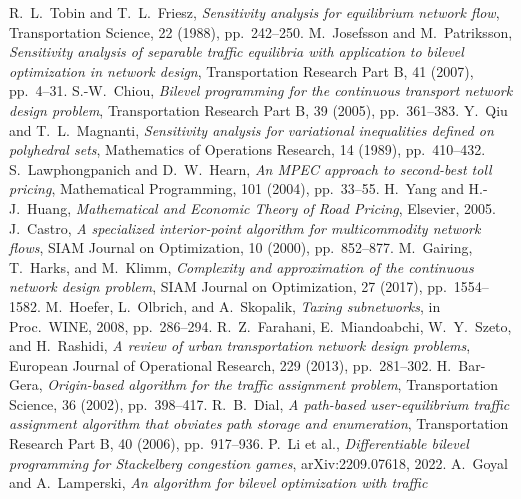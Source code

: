 \documentclass[ijoc]{informs3}
\begin{document}
\begin{thebibliography}{}
 R.~L.~Tobin and T.~L.~Friesz, \emph{Sensitivity analysis for equilibrium network flow},
Transportation Science, 22 (1988), pp.~242--250.
 M.~Josefsson and M.~Patriksson, \emph{Sensitivity analysis of separable traffic equilibria with
application to bilevel optimization in network design}, Transportation Research Part B, 41 (2007), pp.~4--31.
 S.-W.~Chiou, \emph{Bilevel programming for the continuous transport network design problem},
Transportation Research Part B, 39 (2005), pp.~361--383.
 Y.~Qiu and T.~L.~Magnanti, \emph{Sensitivity analysis for variational inequalities defined on polyhedral sets},
Mathematics of Operations Research, 14 (1989), pp.~410--432.
 S.~Lawphongpanich and D.~W.~Hearn, \emph{An MPEC approach to second-best toll pricing},
Mathematical Programming, 101 (2004), pp.~33--55.
 H.~Yang and H.-J.~Huang, \emph{Mathematical and Economic Theory of Road Pricing}, Elsevier, 2005.
 J.~Castro, \emph{A specialized interior-point algorithm for multicommodity network flows},
SIAM Journal on Optimization, 10 (2000), pp.~852--877.
 M.~Gairing, T.~Harks, and M.~Klimm, \emph{Complexity and approximation of the continuous
network design problem}, SIAM Journal on Optimization, 27 (2017), pp.~1554--1582.
 M.~Hoefer, L.~Olbrich, and A.~Skopalik, \emph{Taxing subnetworks}, in Proc.\ WINE, 2008,
pp.~286--294.
 R.~Z.~Farahani, E.~Miandoabchi, W.~Y.~Szeto, and H.~Rashidi, \emph{A review of urban
transportation network design problems}, European Journal of Operational Research, 229 (2013), pp.~281--302.
 H.~Bar-Gera, \emph{Origin-based algorithm for the traffic assignment problem},
Transportation Science, 36 (2002), pp.~398--417.
 R.~B.~Dial, \emph{A path-based user-equilibrium traffic assignment algorithm that obviates
path storage and enumeration}, Transportation Research Part B, 40 (2006), pp.~917--936.
 P.~Li et al., \emph{Differentiable bilevel programming for Stackelberg congestion games},
arXiv:2209.07618, 2022.
 A.~Goyal and A.~Lamperski, \emph{An algorithm for bilevel optimization with traffic
}
\end{thebibliography}
\end{document}
